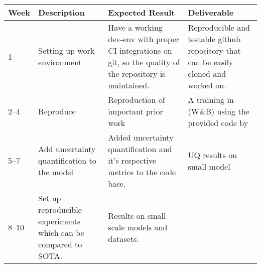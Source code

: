 \documentclass{article}
\begin{document}
\begin{table}[htp]
  \begin{center}
    \begin{tabular}{p{}p{}p{}p{}}
      Week   & Description                                                      & Expected Result                                                                                                                                                                                                                                                                                   & Deliverable                                                                          \\
      \hline
      1      & Setting up work environment                                      & Have a working dev-env with proper CI integrations on git, so the quality of the repository is maintained.                                                                                                                                                                                        & Reproducible and testable github repository that can be easily cloned and worked on. \\
      2--4   & Reproduce \cite{vangansbeke2024ldmseg}                           & Reproduction of important prior work                                                                                                                                                                                                                                                              & A training in (W\&B) using the provided code by \cite{vangansbeke2024ldmseg}         \\
      5--7   & Add uncertainty quantification to the model                      & Added uncertainty quantification and                                        it's respective metrics to the code base.                                                                                                                                                                             & UQ results on small model                                                            \\
      8--10  & Set up reproducible experiments which can be compared to SOTA.   & Results on small scale models and datasets.                                                                                                                                                                                                                                                       &                                                                                      \\

\end{tabular}
\end{center}
\end{table}
\end{document}

